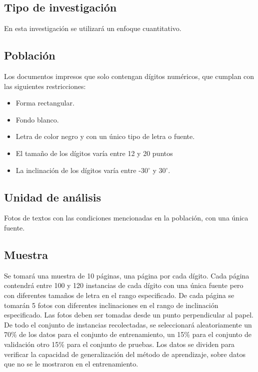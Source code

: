 \documentclass[a4paper, 11pt, oneside]{article}
\begin{document}
	\subsection{Tipo de investigación}
	En esta investigación se utilizará un enfoque cuantitativo.
	
	\subsection{Población}
	Los documentos impresos que solo contengan dígitos numéricos, que cumplan con las siguientes restricciones:
	\begin{itemize}
	\item Forma rectangular.
	\item Fondo blanco.
	\item Letra de color negro y con un único tipo de letra o fuente.
	\item El tamaño de los dígitos varía entre 12 y 20 puntos
	\item La inclinación de los dígitos varía entre -30$^{\circ}$ y 30$^{\circ}$.
	\end{itemize}
	
	\subsection{Unidad de análisis}
	Fotos de textos con las condiciones mencionadas en la población, con una única fuente.

	\subsection{Muestra}
	Se tomará una muestra de 10 páginas, una página por cada dígito. Cada página contendrá entre 100
	y 120 instancias de cada dígito con una única fuente pero con diferentes tamaños de letra en el
	rango especificado. De cada página se tomarán 5 fotos con diferentes inclinaciones en el rango
	de inclinación especificado. Las fotos deben ser tomadas desde un punto perpendicular al papel.
	De todo el conjunto de instancias recolectadas, se seleccionará aleatoriamente un 70\% de los
	datos para el conjunto de entrenamiento, un 15\% para el conjunto de validación otro 15\% para
	el conjunto de pruebas. Los datos se dividen para verificar la capacidad de generalización del
	método de aprendizaje, sobre datos que no se le mostraron en el entrenamiento.
	
\end{document}
